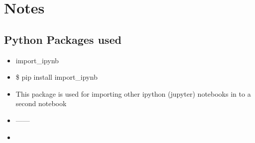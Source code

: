 

\section*{Notes}




\subsection*{Python Packages used}

\begin{itemize}
    \item import\_ipynb
    \item \$ pip install import\_ipynb
    \item This package is used for importing other ipython (jupyter) notebooks in to a second notebook
    \item ------
    \item 
\end{itemize}{}